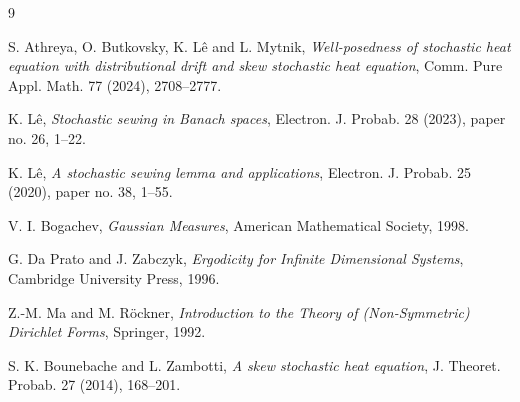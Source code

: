 \documentclass[12pt]{article}
\newcommand{\1}{\mathbf 1}
\begin{document}
\begin{thebibliography}{9}

S. Athreya, O. Butkovsky, K. L\^e and L. Mytnik,
\emph{Well-posedness of stochastic heat equation with distributional drift
and skew stochastic heat equation}, Comm. Pure Appl. Math. 77 (2024),
2708--2777.

K. L\^e,
\emph{Stochastic sewing in Banach spaces}, Electron. J. Probab. 28 (2023),
paper no. 26, 1--22.

K. L\^e,
\emph{A stochastic sewing lemma and applications}, Electron. J. Probab. 25
(2020), paper no. 38, 1--55.

V. I. Bogachev,
\emph{Gaussian Measures}, American Mathematical Society, 1998.

G. Da Prato and J. Zabczyk,
\emph{Ergodicity for Infinite Dimensional Systems}, Cambridge University
Press, 1996.

Z.-M. Ma and M. R\"ockner,
\emph{Introduction to the Theory of (Non-Symmetric) Dirichlet Forms},
Springer, 1992.

S. K. Bounebache and L. Zambotti,
\emph{A skew stochastic heat equation}, J. Theoret. Probab. 27 (2014),
168--201.

\end{thebibliography}
\end{document}

